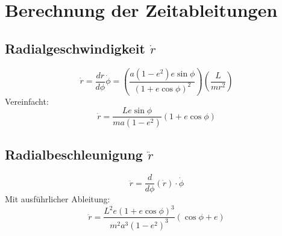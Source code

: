 \section{Berechnung der Zeitableitungen}
\subsection{Radialgeschwindigkeit \( \dot{r} \)}
\[
\dot{r} = \frac{dr}{d\phi} \dot{\phi} = \left( \frac{a(1 - e^2) e \sin \phi}{(1 + e \cos \phi)^2} \right) \left( \frac{L}{m r^2} \right)
\]
Vereinfacht:
\[
\dot{r} = \frac{L e \sin \phi}{m a(1 - e^2)} (1 + e \cos \phi)
\]

\subsection{Radialbeschleunigung \( \ddot{r} \)}
\[
\ddot{r} = \frac{d}{d\phi} (\dot{r}) \cdot \dot{\phi}
\]
Mit ausführlicher Ableitung:
\[
\ddot{r} = \frac{L^2 e (1 + e \cos \phi)^3}{m^2 a^3 (1 - e^2)^3} \left( \cos \phi + e \right)
\]